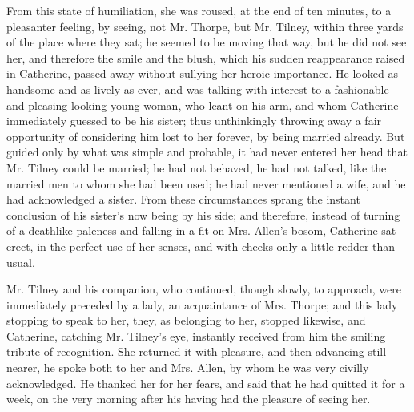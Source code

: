 From this state of humiliation, she was roused, at the end of ten minutes, to a pleasanter feeling, by seeing, not Mr. Thorpe, but Mr. Tilney, within three yards of the place where they sat; he seemed to be moving that way, but he did not see her, and therefore the smile and the blush, which his sudden reappearance raised in Catherine, passed away without sullying her heroic importance. He looked as handsome and as lively as ever, and was talking with interest to a fashionable and pleasing-looking young woman, who leant on his arm, and whom Catherine immediately guessed to be his sister; thus unthinkingly throwing away a fair opportunity of considering him lost to her forever, by being married already. But guided only by what was simple and probable, it had never entered her head that Mr. Tilney could be married; he had not behaved, he had not talked, like the married men to whom she had been used; he had never mentioned a wife, and he had acknowledged a sister. From these circumstances sprang the instant conclusion of his sister's now being by his side; and therefore, instead of turning of a deathlike paleness and falling in a fit on Mrs. Allen's bosom, Catherine sat erect, in the perfect use of her senses, and with cheeks only a little redder than usual.

Mr. Tilney and his companion, who continued, though slowly, to approach, were immediately preceded by a lady, an acquaintance of Mrs. Thorpe; and this lady stopping to speak to her, they, as belonging to her, stopped likewise, and Catherine, catching Mr. Tilney's eye, instantly received from him the smiling tribute of recognition. She returned it with pleasure, and then advancing still nearer, he spoke both to her and Mrs. Allen, by whom he was very civilly acknowledged.  He thanked her for her fears, and said that he had quitted it for a week, on the very morning after his having had the pleasure of seeing her.



